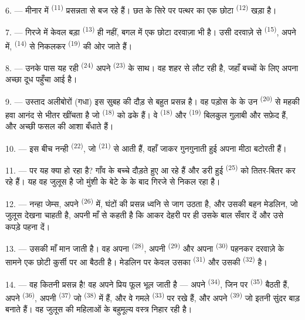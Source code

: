6. --- मीनार में  \textsuperscript{(11)} प्रसन्नता से बज रहे हैं।
छत के सिरे पर पत्थर का एक छोटा  \textsuperscript{(12)} खड़ा है।

7. --- गिरजे में केवल बड़ा  \textsuperscript{(13)} ही नहीं, बगल में
एक छोटा दरवाज़ा भी है। उसी दरवाज़े से  \textsuperscript{(15)}, अपने
 में,  \textsuperscript{(14)} से निकलकर
 \textsuperscript{(19)} की ओर जाते हैं।

8. --- उनके पास यह रही  \textsuperscript{(24)} अपने
 \textsuperscript{(23)} के साथ। वह शहर से लौट रही है, जहाँ बच्चों के
लिए अपना अच्छा दूध पहुँचा आई है।

\VUsaut{4.0mm}
\VUsaut{3.4mm}

9. --- उस्ताद अलीबोरों (गधा) इस सुबह की दौड़ से बहुत प्रसन्न है। वह पड़ोस के
 के उन  \textsuperscript{(20)} से महकी हवा आनंद से
भीतर खींचता है जो  \textsuperscript{(18)} को ढके हैं। वे
 \textsuperscript{(18)} और 
\textsuperscript{(19)} बिलकुल गुलाबी और सफ़ेद हैं, और अच्छी फसल की आशा बँधाते
हैं।

10. --- इस बीच नन्ही  \textsuperscript{(22)}, जो
 \textsuperscript{(21)} से आती हैं, वहाँ जाकर गुनगुनाती हुई अपना
मीठा  बटोरती हैं।

11. --- पर यह क्या हो रहा है? गाँव के बच्चे दौड़ते हुए आ रहे हैं और डरी हुई
 \textsuperscript{(25)} को तितर-बितर कर रहे हैं। यह वह जुलूस है जो
मुंशी के बेटे के  के बाद गिरजे से निकल रहा है।

12. --- नन्हा जेम्स, अपने  \textsuperscript{(26)} में, घंटों की
प्रसन्न ध्वनि से जाग उठता है, और उसकी बहन मेडलिन, जो जुलूस देखना चाहती है, अपनी
माँ से कहती है कि आकर देहरी पर ही उसके बाल सँवार दें और उसे कपड़े पहना दें।

13. --- उसकी माँ मान जाती है। वह अपना  \textsuperscript{(28)},
अपनी  \textsuperscript{(29)} और अपना  \textsuperscript{(30)}
पहनकर दरवाज़े के सामने एक छोटी कुर्सी पर आ बैठती है। मेडलिन पर केवल उसका
 \textsuperscript{(31)} और उसकी  \textsuperscript{(32)}
है।

14. --- वह कितनी प्रसन्न है! वह अपने प्रिय फूल भूल जाती है — अपने
 \textsuperscript{(34)}, जिन पर 
\textsuperscript{(35)} बैठती हैं, अपने  \textsuperscript{(36)}, अपनी
 \textsuperscript{(37)} जो 
\textsuperscript{(38)} में हैं, और वे गमले  \textsuperscript{(33)}
पर रखे हैं, और अपने 
\textsuperscript{(39)} जो इतनी सुंदर बाड़ बनाते हैं। वह जुलूस की महिलाओं के बहुमूल्य
वस्त्र निहार रही है।


